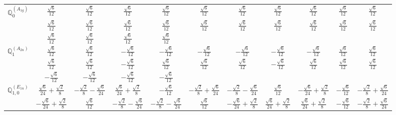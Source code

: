 \documentclass[fleqn,10pt,landscape]{article}
\begin{document}
\begin{itemize}
{\begin{center}
\begin{longtable}{ccccccccccc}
$\mathbb{Q}_{0}^{(A_{1g})}$ & $ \frac{\sqrt{6}}{12} $ & $ \frac{\sqrt{6}}{12} $ & $ \frac{\sqrt{6}}{12} $ & $ \frac{\sqrt{6}}{12} $ & $ \frac{\sqrt{6}}{12} $ & $ \frac{\sqrt{6}}{12} $ & $ \frac{\sqrt{6}}{12} $ & $ \frac{\sqrt{6}}{12} $ & $ \frac{\sqrt{6}}{12} $ & $ \frac{\sqrt{6}}{12} $ \\
& $ \frac{\sqrt{6}}{12} $ & $ \frac{\sqrt{6}}{12} $ & $ \frac{\sqrt{6}}{12} $ & $ \frac{\sqrt{6}}{12} $ & $ \frac{\sqrt{6}}{12} $ & $ \frac{\sqrt{6}}{12} $ & $ \frac{\sqrt{6}}{12} $ & $ \frac{\sqrt{6}}{12} $ & $ \frac{\sqrt{6}}{12} $ & $ \frac{\sqrt{6}}{12} $ \\
& $ \frac{\sqrt{6}}{12} $ & $ \frac{\sqrt{6}}{12} $ & $ \frac{\sqrt{6}}{12} $ & $ \frac{\sqrt{6}}{12} $ & $  $ & $  $ & $  $ & $  $ & $  $ & $  $ \\ \hline
$\mathbb{Q}_{1}^{(A_{2u})}$ & $ \frac{\sqrt{6}}{12} $ & $ \frac{\sqrt{6}}{12} $ & $ - \frac{\sqrt{6}}{12} $ & $ - \frac{\sqrt{6}}{12} $ & $ - \frac{\sqrt{6}}{12} $ & $ - \frac{\sqrt{6}}{12} $ & $ - \frac{\sqrt{6}}{12} $ & $ - \frac{\sqrt{6}}{12} $ & $ \frac{\sqrt{6}}{12} $ & $ \frac{\sqrt{6}}{12} $ \\
& $ \frac{\sqrt{6}}{12} $ & $ \frac{\sqrt{6}}{12} $ & $ - \frac{\sqrt{6}}{12} $ & $ \frac{\sqrt{6}}{12} $ & $ \frac{\sqrt{6}}{12} $ & $ \frac{\sqrt{6}}{12} $ & $ - \frac{\sqrt{6}}{12} $ & $ \frac{\sqrt{6}}{12} $ & $ \frac{\sqrt{6}}{12} $ & $ \frac{\sqrt{6}}{12} $ \\
& $ - \frac{\sqrt{6}}{12} $ & $ - \frac{\sqrt{6}}{12} $ & $ - \frac{\sqrt{6}}{12} $ & $ - \frac{\sqrt{6}}{12} $ & $  $ & $  $ & $  $ & $  $ & $  $ & $  $ \\ \hline
$\mathbb{Q}_{1,0}^{(E_{1u})}$ & $ \frac{\sqrt{6}}{24} + \frac{\sqrt{2}}{8} $ & $ - \frac{\sqrt{2}}{8} - \frac{\sqrt{6}}{24} $ & $ \frac{\sqrt{6}}{24} + \frac{\sqrt{2}}{8} $ & $ - \frac{\sqrt{6}}{12} $ & $ - \frac{\sqrt{2}}{8} + \frac{\sqrt{6}}{24} $ & $ - \frac{\sqrt{2}}{8} - \frac{\sqrt{6}}{24} $ & $ \frac{\sqrt{6}}{12} $ & $ - \frac{\sqrt{6}}{24} + \frac{\sqrt{2}}{8} $ & $ - \frac{\sqrt{6}}{12} $ & $ - \frac{\sqrt{2}}{8} + \frac{\sqrt{6}}{24} $ \\
& $ - \frac{\sqrt{6}}{24} + \frac{\sqrt{2}}{8} $ & $ \frac{\sqrt{6}}{12} $ & $ - \frac{\sqrt{2}}{8} - \frac{\sqrt{6}}{24} $ & $ - \frac{\sqrt{2}}{8} - \frac{\sqrt{6}}{24} $ & $ \frac{\sqrt{6}}{12} $ & $ - \frac{\sqrt{6}}{24} + \frac{\sqrt{2}}{8} $ & $ \frac{\sqrt{6}}{24} + \frac{\sqrt{2}}{8} $ & $ \frac{\sqrt{6}}{24} + \frac{\sqrt{2}}{8} $ & $ - \frac{\sqrt{6}}{12} $ & $ - \frac{\sqrt{2}}{8} + \frac{\sqrt{6}}{24} $ \\

\end{longtable}
\end{center}}
\end{itemize}
\end{document}
